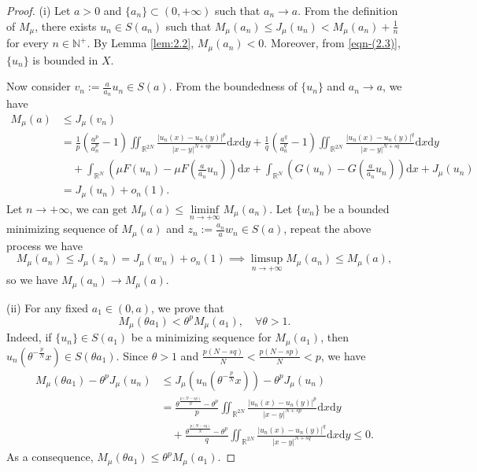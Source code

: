 \documentclass[reqno]{amsart}
\begin{document}
\begin{proof}
(i) Let $a>0$ and $\{a_n\}\subset(0,+\infty)$ such that $a_n\to a$.
From the definition of  $M_\mu$, there exists $u_n\in S(a_n)$ such that 
$M_\mu(a_n)\le J_\mu(u_n)<M_\mu(a_n)+\frac{1}{n}$ for every $n\in\mathbb{N}^{+}$.
By Lemma \ref{lem:2.2},  $M_\mu(a_n)<0$.
Moreover, from \eqref{eqn-(2.3)}, $\{u_n\}$ is bounded in $X$.

Now consider $v_n:=\frac{a}{a_n}u_n\in S(a)$. From the boundedness of 
$\{u_n\}$ and $a_n\to a$, we have
\begin{align*}
M_\mu(a)&\leq  J_\mu(v_n)\\
&= \frac{1}{p}(\frac{a^{p}}{a_n^{p}}-1)\iint_{\mathbb{R}^{2N}}
\frac{|u_n(x)-u_n(y)|^{p}}{|x-y|^{N+sp}}\mathrm{d}x\mathrm{d}y
+\frac{1}{q}(\frac{a^{q}}{a_n^{q}}-1)\iint_{\mathbb{R}^{2N}}
\frac{|u_n(x)-u_n(y)|^{q}}{|x-y|^{N+sq}}\mathrm{d}x\mathrm{d}y\\
&\quad +\int_{\mathbb{R}^N}(\mu F(u_n)-\mu F(\frac{a}{a_n}u_n))\mathrm{d}x
+\int_{\mathbb{R}^N}( G(u_n)- G(\frac{a}{a_n}u_n))\mathrm{d}x+J_\mu(u_n)\\
&= J_\mu(u_n)+o_n(1).
\end{align*}
Let $n\to +\infty$, we can get $M_\mu(a)\le \underset{n\to +\infty}\liminf  M_\mu(a_n)$.
Let $\{w_n\}$ be a bounded minimizing sequence of $M_\mu(a)$ and 
$z_n:=\frac{a_n}{a}w_n\in S(a)$, repeat the above process we have
$$ 
M_\mu(a_n)\le J_\mu(z_n)=J_\mu(w_n)+o_n(1)\implies 
 \limsup_{n\to+\infty}  M_\mu(a_n)\le M_\mu(a),
$$
so we have $M_\mu(a_n)\to M_\mu(a)$.

(ii) For any fixed $a_1\in(0,a)$, we prove that
\begin{equation}\label{eqn-(2.6)}
M_\mu(\theta a_1)<{\theta}^{p}M_\mu(a_1),\quad\forall\theta>1.
\end{equation}
Indeed, if $\{u_n\}\in S(a_1)$ be a minimizing sequence for $M_\mu(a_1)$, 
then $u_n(\theta^{-\frac{p}{N}}x)\in S(\theta a_1)$.
Since $\theta>1$ and $\frac{p(N-sq)}{N}<\frac{p(N-sp)}{N}<p$, we have
\begin{align*}
M_\mu(\theta a_1)-\theta^{p}J_\mu(u_n)&\leq  J_\mu(u_n(\theta^{-\frac{p}{N}}x))
 -\theta^{p}J_\mu(u_n)\\
&= \frac{\theta^{\frac{p(N-sp)}{N}}-\theta^{p}}{p}
 \iint_{\mathbb{R}^{2N}}\frac{|u_n(x)-u_n(y)|^{p}}{|x-y|^{N+sp}}\mathrm{d}x\mathrm{d}y\\
&\quad +\frac{\theta^{\frac{p(N-sq)}{N}}-\theta^{p}}{q}
 \iint_{\mathbb{R}^{2N}}\frac{|u_n(x)-u_n(y)|^{q}}{|x-y|^{N+sq}}\mathrm{d}x\mathrm{d}y
\leq 0.
\end{align*}
As a consequence, $M_\mu(\theta a_1)\le{\theta}^{p}M_\mu(a_1)$.


\end{proof}
\end{document}
